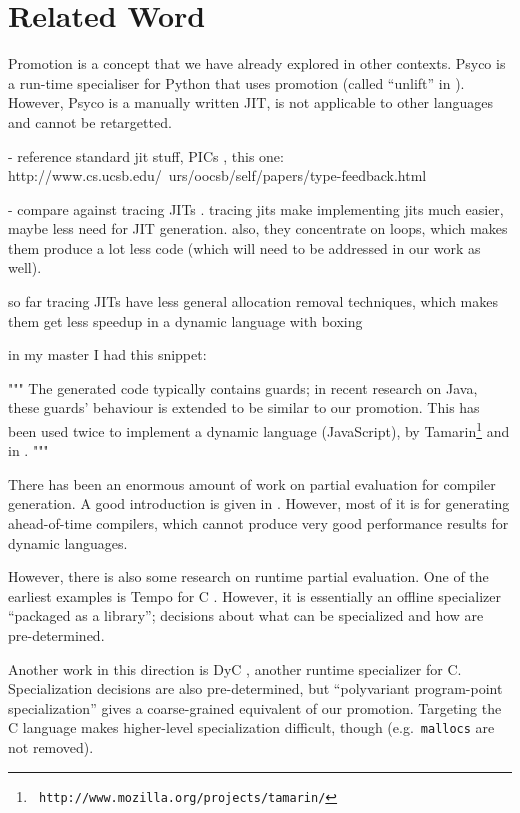 \section{Related Word}
Promotion is a concept that we have already explored in other contexts. Psyco is
a run-time specialiser for Python that uses promotion (called ``unlift'' in
\cite{DBLP:conf/pepm/Rigo04}). However, Psyco is a manually written JIT, is
not applicable to other languages and cannot be retargetted.


 - reference standard jit stuff, PICs \cite{hoelzle_optimizing_1991}, this one: http://www.cs.ucsb.edu/~urs/oocsb/self/papers/type-feedback.html
 
 - compare against tracing JITs \cite{gal_hotpathvm_2006}. tracing jits make
 implementing jits much easier, maybe less need for JIT generation. also, they
 concentrate on loops, which makes them produce a lot less code (which will need
 to be addressed in our work as well).

 so far tracing JITs have less general allocation removal techniques, which
 makes them get less speedup in a dynamic language with boxing

in my master I had this snippet:

"""
The generated code typically contains guards; in recent research
\cite{gal_incremental_2006} on Java, these guards' behaviour is extended to be
similar to our promotion.  This has been used twice to implement a dynamic
language (JavaScript), by Tamarin\footnote{{\tt
http://www.mozilla.org/projects/tamarin/}} and in \cite{chang_efficient_2007}.
"""

There has been an enormous amount of work on partial evaluation for compiler
generation. A good introduction is given in \cite{Jones:peval}. However, most of
it is for generating ahead-of-time compilers, which cannot produce very good
performance results for dynamic languages.

However, there is also some research on runtime partial evaluation. One of the
earliest examples is Tempo for C
\cite{DBLP:conf/popl/ConselN96,DBLP:conf/dagstuhl/ConselHNNV96}. However, it is
essentially an offline specializer ``packaged as a library''; decisions about
what can be specialized and how are pre-determined.

Another work in this direction is DyC \cite{grant_dyc_2000}, another runtime
specializer for C.  Specialization decisions are also pre-determined, but
``polyvariant program-point specialization'' gives a coarse-grained equivalent
of our promotion.  Targeting the C language makes higher-level specialization
difficult, though (e.g.\ \texttt{mallocs} are not removed).

